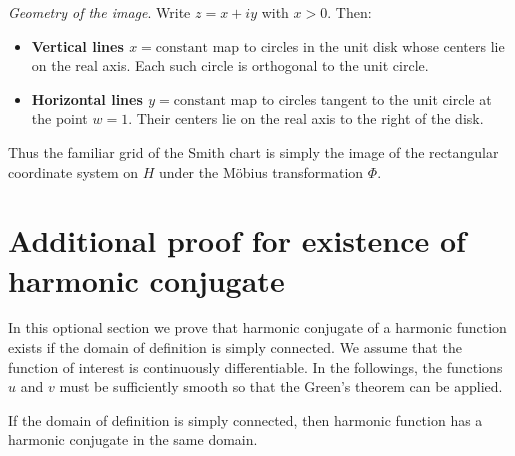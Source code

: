 {\em Geometry of the image}. 
Write $z=x+iy$ with $x>0$. Then:

\begin{itemize}
	\item \textbf{Vertical lines $x=\text{constant}$} map to circles in
	the unit disk whose centers lie on the real axis. Each such circle is orthogonal to the unit circle.
	
	\item \textbf{Horizontal lines $y=\text{constant}$} map to circles
	tangent to the unit circle at the point $w=1$. Their centers lie on
	the real axis to the right of the disk.
\end{itemize}

Thus the familiar grid of the Smith chart is simply the image of the
rectangular coordinate system on $H$ under the Möbius transformation
$\Phi$.



\section{Additional proof for existence of harmonic conjugate}
\label{sec:harmonic_conjugate}
In this optional section we prove that harmonic conjugate of a harmonic function exists if the domain of definition is simply connected.   We assume that the function of interest is continuously differentiable.  In the followings, the functions $u$ and $v$ must be sufficiently smooth so that the Green's theorem can be applied.



\begin{svgraybox}
	\begin{theorem}
If the domain of definition is simply connected, then 
harmonic function has a harmonic conjugate in the same domain.
	\end{theorem}
\end{svgraybox}

